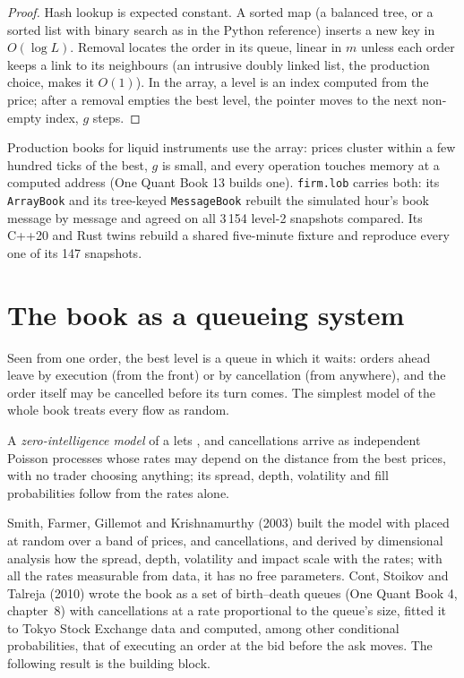 \begin{proof}
Hash lookup is expected constant. A sorted map (a balanced tree, or a sorted list with binary search as in the Python reference) inserts a new key
in $O(\log L)$. Removal locates the order in its queue, linear in $m$ unless each order keeps a link to its neighbours (an intrusive doubly linked list,
the production choice, makes it $O(1)$). In the array, a level is an index computed from the price; after a removal empties the best level, the
pointer moves to the next non-empty index, $g$ steps.
\end{proof}

Production books for liquid instruments use the array: prices cluster within a few hundred ticks of the best, $g$ is small, and every
operation touches memory at a computed address (One Quant Book 13 builds one). \texttt{firm.lob} carries both: its \texttt{ArrayBook} and its
tree-keyed \texttt{MessageBook} rebuilt the simulated hour's book message by message and agreed on all 3\,154 level-2 snapshots compared. Its C++20
and Rust twins rebuild a shared five-minute fixture and reproduce every one of its 147 snapshots.

\section{The book as a queueing system}

Seen from one order, the best level is a queue in which it waits: orders ahead leave by execution (from the front) or by cancellation (from
anywhere), and the order itself may be cancelled before its turn comes. The simplest model of the whole book treats every flow as random.

\begin{definition}\label{def:mx:the-limit-order-book:zi}
A \emph{zero-intelligence model} of a  lets ,  and cancellations arrive as
independent Poisson processes whose rates may depend on the distance from the best prices, with no trader choosing anything; its spread,
depth, volatility and fill probabilities follow from the rates alone.
\end{definition}

Smith, Farmer, Gillemot and Krishnamurthy (2003) built the model with  placed at random over a band of prices,  and
cancellations, and derived by dimensional analysis how the spread, depth, volatility and impact scale with the rates; with all the rates measurable
from data, it has no free parameters. Cont, Stoikov and Talreja (2010) wrote the book as a set of birth--death queues (One Quant Book 4, chapter~8) with
cancellations at a rate proportional to the queue's size, fitted it to Tokyo Stock Exchange data and computed, among other conditional
probabilities, that of executing an order at the bid before the ask moves. The following result is the building block.

